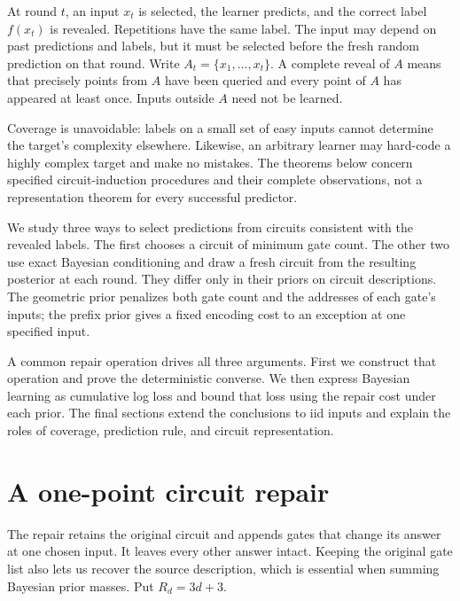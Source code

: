 \documentclass[11pt]{article}
\newcommand{\1}{\mathbf 1}
\begin{document}
At round $t$, an input $x_t$ is selected, the learner predicts, and the
correct label $f(x_t)$ is revealed. Repetitions have the same label.
The input may depend on past predictions and labels, but it must be
selected before the fresh random prediction on that round. Write
$A_t=\{x_1,\ldots,x_t\}$. A complete reveal of $A$ means that precisely
points from $A$ have been queried and every point of $A$ has appeared at
least once. Inputs outside $A$ need not be learned.

Coverage is unavoidable: labels on a small set of easy inputs cannot
determine the target's complexity elsewhere. Likewise, an arbitrary
learner may hard-code a highly complex target and make no mistakes. The
theorems below concern specified circuit-induction procedures and their
complete observations, not a representation theorem for every successful
predictor.

We study three ways to select predictions from circuits consistent with
the revealed labels. The first chooses a circuit of minimum gate count.
The other two use exact Bayesian conditioning and draw a fresh circuit
from the resulting posterior at each round. They differ only in their
priors on circuit descriptions. The geometric prior penalizes both gate
count and the addresses of each gate's inputs; the prefix prior gives a
fixed encoding cost to an exception at one specified input.

A common repair operation drives all three arguments. First we construct
that operation and prove the deterministic converse. We then express
Bayesian learning as cumulative log loss and bound that loss using the
repair cost under each prior. The final sections extend the conclusions
to iid inputs and explain the roles of coverage, prediction rule, and
circuit representation.

\section{A one-point circuit repair}

The repair retains the original circuit and appends gates that change
its answer at one chosen input. It leaves every other answer intact.
Keeping the original gate list also lets us recover the source
description, which is essential when summing Bayesian prior masses.
Put $R_d=3d+3$.
\end{document}
